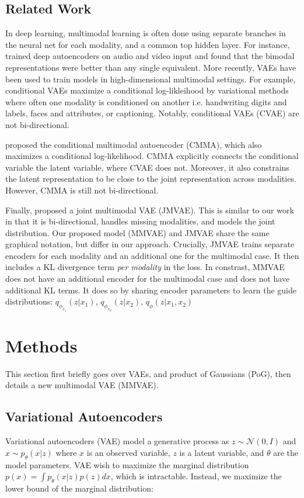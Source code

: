 \documentclass{article}
\begin{document}
\subsection{Related Work}
In deep learning, multimodal learning is often done using separate branches in the neural net for each modality, and a common top hidden layer. For instance, \citet{ngiam2011multimodal} trained deep autoencoders on audio and video input and found that the bimodal representations were better than any single equivalent. More recently, VAEs \cite{kingma2013auto, kingma2014semi} have been used to train models in high-dimensional multimodal settings. For example, conditional VAEs \cite{sohn2015learning} maximize a conditional log-likleihood by variational methods where often one modality is conditioned on another i.e. handwriting digits and labels, faces and attributes, or captioning. Notably, conditional VAEs (CVAE) are not bi-directional. 

\citet{pandey2017variational} proposed the conditional multimodal autoencoder (CMMA), which also maximizes a conditional log-likelihood. CMMA explicitly connects the conditional variable the latent variable, where CVAE does not. Moreover, it also constrains the latent representation to be close to the joint representation across modalities. However, CMMA is still not bi-directional.

Finally, \citet{suzuki2016joint} proposed a joint multimodal VAE (JMVAE). This is similar to our work in that it is bi-directional, handles missing modalities, and models the joint distribution. Our proposed model (MMVAE) and JMVAE share the same graphical notation, but differ in our approach. Crucially, JMVAE trains separate encoders for each modality and an additional one for the multimodal case. It then includes a KL divergence term \textit{per modality} in the loss. In constrast, MMVAE does not have an additional encoder for the multimodal case and does not have additional KL terms. It does so by sharing encoder parameters to learn the guide distributions: $q_{\phi_{x_{1}}}(z|x_{1})$, $q_{\phi_{x_{2}}}(z|x_{2})$, $q_{\phi}(z|x_{1}, x_{2})$

\section{Methods}
This section first briefly goes over VAEs, and product of Gaussians (PoG), then details a new multimodal VAE (MMVAE).

\subsection{Variational Autoencoders}
Variational autoencoders (VAE) model a generative process as $z \sim \mathcal{N}(0, I)$ and $x \sim p_{\theta}(x | z)$ where $x$ is an observed variable, $z$ is a latent variable, and $\theta$ are the model parameters. VAE wish to maximize the marginal distribution $p(x) = \int p_{\theta}(x | z)p(z)dx$, which is intractable. Instead, we maximize the lower bound of the marginal distribution:
\end{document}
